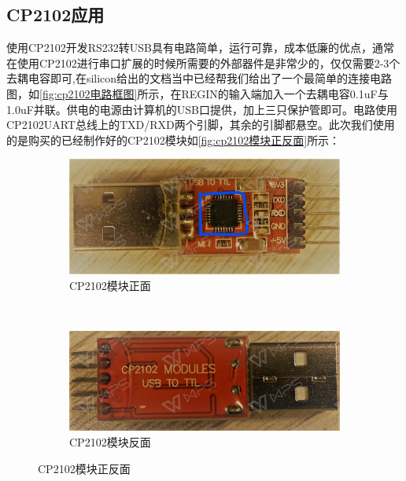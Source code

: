 \subsection{CP2102应用}
	使用CP2102开发RS232转USB具有电路简单，运行可靠，成本低廉的优点，通常在使用CP2102进行串口扩展的时候所需要的外部器件是非常少的，仅仅需要2-3个去耦电容即可,在silicon给出的文档当中已经帮我们给出了一个最简单的连接电路图，如\autoref{fig:cp2102电路框图}所示，在REGIN的输入端加入一个去耦电容0.1uF与1.0uF并联。供电的电源由计算机的USB口提供，加上三只保护管即可。电路使用CP2102UART总线上的TXD/RXD两个引脚，其余的引脚都悬空。此次我们使用的是购买的已经制作好的CP2102模块如\autoref{fig:cp2102模块正反面}所示：
\begin{figure}[h]
\centering
  \begin{subfigure}[b]{0.4\textwidth}
  \includegraphics[width=\textwidth]{./graphics/cp2102Front.pdf}
  \caption{CP2102模块正面}\label{fig:cp2102Front}
  \end{subfigure}
  ~
  \begin{subfigure}[b]{0.4\textwidth}
  \includegraphics[width=\textwidth]{./graphics/cp2102Rear.pdf}
  \caption{CP2102模块反面}\label{fig:cp2102Rear}
  \end{subfigure}
\caption{CP2102模块正反面}\label{fig:cp2102模块正反面}
\end{figure}
	




